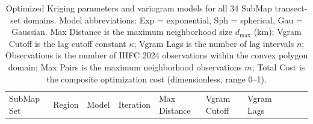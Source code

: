 \documentclass[final]{agujournal2019}
\begin{document}
\clearpage

\begin{longtable}[]{@{}
  >{\raggedright\arraybackslash}p{}
  >{\raggedleft\arraybackslash}p{}
  >{\raggedleft\arraybackslash}p{}
  >{\raggedleft\arraybackslash}p{}
  >{\raggedleft\arraybackslash}p{}
  >{\raggedleft\arraybackslash}p{}
  >{\raggedleft\arraybackslash}p{}
  >{\raggedleft\arraybackslash}p{}
  >{\raggedleft\arraybackslash}p{}
  >{\raggedleft\arraybackslash}p{}@{}}
\caption{Optimized Kriging parameters and variogram models for all 34
SubMap transect-set domains. Model abbreviations: Exp = exponential, Sph
= spherical, Gau = Gaussian. Max Distance is the maximum neighborhood
size \(d_\mathrm{max}\) (km); Vgram Cutoff is the lag cutoff constant
\(\kappa\); Vgram Lags is the number of lag intervals \(n\);
Observations is the number of IHFC 2024 observations within the convex
polygon domain; Max Pairs is the maximum neighborhood observations
\(m\); Total Cost is the composite optimization cost (dimensionless,
range 0--1).}\label{tbl:nlopt-summary}\tabularnewline
\toprule\noalign{}
\begin{minipage}[b]{\linewidth}\raggedright
SubMap Set
\end{minipage} & \begin{minipage}[b]{\linewidth}\raggedleft
Region
\end{minipage} & \begin{minipage}[b]{\linewidth}\raggedleft
Model
\end{minipage} & \begin{minipage}[b]{\linewidth}\raggedleft
Iteration
\end{minipage} & \begin{minipage}[b]{\linewidth}\raggedleft
Max Distance
\end{minipage} & \begin{minipage}[b]{\linewidth}\raggedleft
Vgram Cutoff
\end{minipage} & \begin{minipage}[b]{\linewidth}\raggedleft
Vgram Lags
\end{minipage} & \begin{minipage}[b]{\linewidth}\raggedleft

\end{minipage}
\end{longtable}
\end{document}
